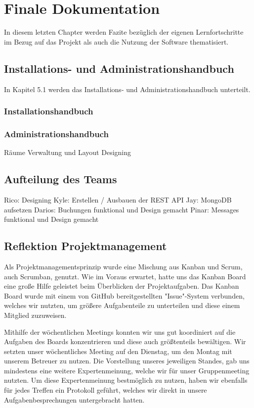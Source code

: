 \chapter{Finale Dokumentation}

In diesem letzten Chapter werden Fazite bezüglich der eigenen Lernfortschritte im Bezug auf das Projekt als auch die Nutzung der Software thematisiert.

\section{Installations- und Administrationshandbuch}

In Kapitel 5.1 werden das Installations- und Administrationshandbuch unterteilt.
\subsection{Installationshandbuch}

\subsection{Administrationshandbuch}
Räume Verwaltung und Layout Designing

\section{Aufteilung des Teams}

Rico: Designing 
Kyle: Erstellen / Ausbauen der REST API
Jay: MongoDB aufsetzen
Darios: Buchungen funktional und Design gemacht
Pinar: Messages funktional und Design gemacht

\section{Reflektion Projektmanagement}

Als Projektmanagementsprinzip wurde eine Mischung aus Kanban und Scrum, auch Scrumban, genutzt.
Wie im Voraus erwartet, hatte uns das Kanban Board eine große Hilfe geleistet beim Überblicken der Projektaufgaben.
Das Kanban Board wurde mit einem von GitHub bereitgestellten "Issue"-System verbunden, welches wir nutzten, um größere Aufgabenteile zu unterteilen und diese einem Mitglied zuzuweisen.

Mithilfe der wöchentlichen Meetings konnten wir uns gut koordiniert auf die Aufgaben des Boards konzentrieren und diese auch größtenteils bewältigen.
Wir setzten unser wöchentliches Meeting auf den Dienstag, um den Montag mit unserem Betreuer zu nutzen.
Die Vorstellung unseres jeweiligen Standes, gab uns mindestens eine weitere Expertenmeinung, welche wir für unser Gruppenmeeting nutzten.
Um diese Expertenmeinung bestmöglich zu nutzen, haben wir ebenfalls für jedes Treffen ein Protokoll geführt, welches wir direkt in unsere Aufgabenbesprechungen untergebracht hatten.


